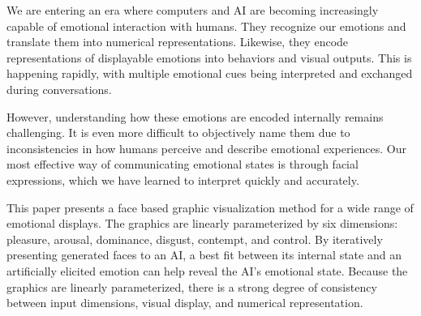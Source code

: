 We are entering an era where computers and AI are becoming increasingly capable
of emotional interaction with humans.
They recognize our emotions and translate them into numerical representations.
Likewise, they encode representations of displayable emotions into behaviors and visual outputs.
This is happening rapidly, with multiple emotional cues being interpreted and exchanged during conversations.

However, understanding how these emotions are encoded internally remains challenging.
It is even more difficult to objectively name them due to inconsistencies in how humans
perceive and describe emotional experiences. Our most effective way of communicating
emotional states is through facial expressions, which we have learned to interpret quickly and accurately.

This paper presents a face based graphic visualization method for a wide range of emotional displays.
The graphics are linearly parameterized by six dimensions:
pleasure, arousal, dominance, disgust, contempt, and control.
By iteratively presenting generated faces to an AI, a best fit between its
internal state and an artificially elicited emotion can help reveal the AI's emotional state.
Because the graphics are linearly parameterized, there is a strong degree of
consistency between input dimensions, visual display, and numerical representation.